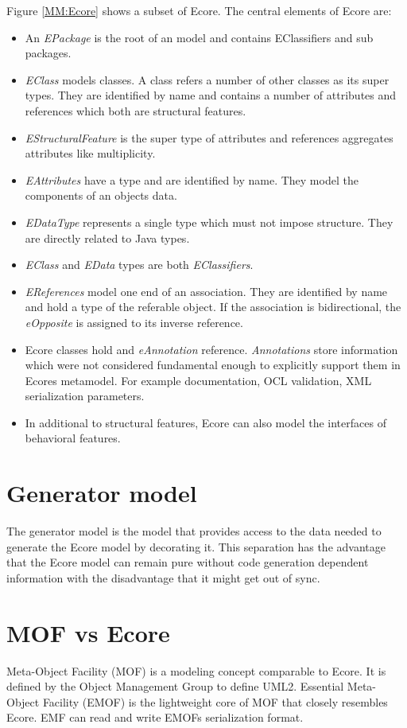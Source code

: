 Figure \ref{MM:Ecore} shows a subset of Ecore. The central elements of Ecore are:\\
\begin{itemize}
	\item An \emph{EPackage} is the root of an model and contains EClassifiers and sub packages.
	\item \emph{EClass} models classes. A class refers a number of other classes as its super types. They are identified by name and contains a number of attributes and references which both are structural features.
	\item \emph{EStructuralFeature} is the super type of attributes and references aggregates attributes like multiplicity.
	\item \emph{EAttributes} have a type and are identified by name. They model the components of an objects data.
	\item \emph{EDataType} represents a single type which must not impose structure. They are directly related to Java types.
	\item \emph{EClass} and \emph{EData} types are both \emph{EClassifiers}.
	\item \emph{EReferences} model one end of an association. They are identified by name and hold a type of the referable object. If the association is bidirectional, the \emph{eOpposite} is assigned to its inverse reference. \cite{EMF2nd}
	\item Ecore classes hold and \emph{eAnnotation} reference. \emph{Annotations} store information which were not considered fundamental enough to explicitly support them in Ecores metamodel. For example documentation, OCL validation, XML serialization parameters. \cite{EMP}
	\item In additional to structural features, Ecore can also model the interfaces of behavioral features.
\end{itemize}

\section{Generator model}
The generator model is the model that provides access to the data needed to generate the Ecore model by decorating it. This separation has the advantage that the Ecore model can remain pure without code generation dependent information with the disadvantage that it might get out of sync. \cite{EMF2nd}

\section{MOF vs Ecore}
Meta-Object Facility (MOF) is a modeling concept comparable to Ecore. It is defined by the Object Management Group \cite{OMG} to define UML2. Essential Meta-Object Facility (EMOF) is the lightweight core of MOF that closely resembles Ecore. EMF can read and write EMOFs serialization format. \cite{EMP}

